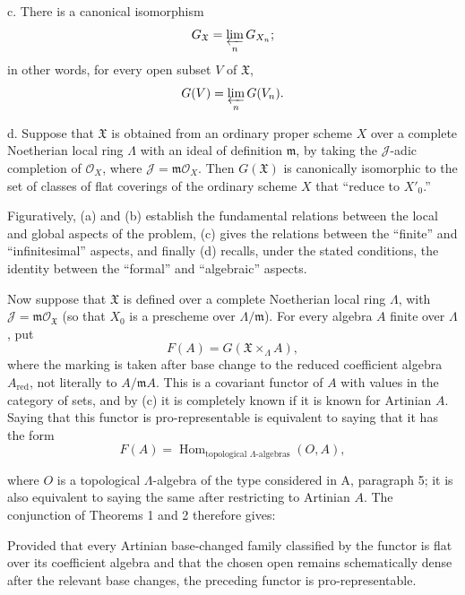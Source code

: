 \noindent c. There is a canonical isomorphism
\[
  G_{\mathfrak X}=\varprojlim_nG_{X_n};
\]
in other words, for every open subset $V$ of $\mathfrak X$,
\[
  G(V)=\varprojlim_nG(V_n).
\]

\noindent d. Suppose that $\mathfrak X$ is obtained from an ordinary proper
scheme $X$ over a complete Noetherian local ring $\Lambda$ with an ideal of
definition $\mathfrak m$, by taking the $\mathcal J$-adic completion of
$\mathcal O_X$, where $\mathcal J=\mathfrak m\mathcal O_X$. Then
$G(\mathfrak X)$ is canonically isomorphic to the set of classes of flat
coverings of the ordinary scheme $X$ that “reduce to $X'_0$.”

Figuratively, (a) and (b) establish the fundamental relations between the
local and global aspects of the problem, (c) gives the relations between the
“finite” and “infinitesimal” aspects, and finally (d) recalls, under the stated
conditions, the identity between the “formal” and “algebraic” aspects.

Now suppose that $\mathfrak X$ is defined over a complete Noetherian local ring
$\Lambda$, with $\mathcal J=\mathfrak m\mathcal O_{\mathfrak X}$ (so that
$X_0$ is a prescheme over $\Lambda/\mathfrak m$). For every algebra $A$ finite
over $\Lambda$, put
\[
  F(A)=G(\mathfrak X\times_\Lambda A),
\]
where the marking is taken after base change to the reduced coefficient algebra $A_{\mathrm{red}}$, not literally to $A/\mathfrak mA$. This is a covariant functor of $A$ with values in the category of sets, and by
(c) it is completely known if it is known for Artinian $A$. Saying that this
functor is pro-representable is equivalent to saying that it has the form
\[
  F(A)=\operatorname{Hom}_{\text{topological }\Lambda\text{-algebras}}(O,A),
\]

where $O$ is a topological $\Lambda$-algebra of the type considered in A,
paragraph 5; it is also equivalent to saying the same after restricting to
Artinian $A$. The conjunction of Theorems 1 and 2 therefore gives:

 Provided that every Artinian base-changed family classified by the functor is flat over its coefficient algebra and that the chosen open remains schematically dense after the relevant base changes, the preceding functor is pro-representable.

